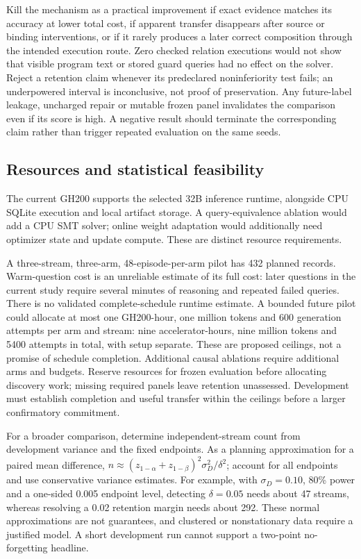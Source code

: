 \documentclass[10pt,twocolumn]{article}
\begin{document}
Kill the mechanism as a practical improvement if exact evidence matches its
accuracy at lower total cost, if apparent transfer disappears after source or
binding interventions, or if it rarely produces a later correct composition through the intended execution
route. Zero checked relation executions would not show that visible program
text or stored guard queries had no effect on the solver.
Reject a retention claim whenever its predeclared noninferiority test fails;
an underpowered interval is inconclusive, not proof of preservation. Any
future-label leakage, uncharged repair or mutable frozen panel invalidates the
comparison even if its score is high. A negative result should terminate the
corresponding claim rather than trigger repeated evaluation on the same seeds.

\subsection{Resources and statistical feasibility}
The current GH200 supports the selected 32B inference runtime, alongside CPU
SQLite execution and local artifact storage. A query-equivalence ablation would
add a CPU SMT solver; online weight adaptation would additionally need optimizer
state and update compute. These are distinct resource requirements.

A three-stream, three-arm, 48-episode-per-arm pilot has 432 planned records.
Warm-question cost is an unreliable estimate of its full cost: later questions
in the current study require several minutes of reasoning and repeated failed
queries. There is no validated complete-schedule runtime estimate. A bounded
future pilot could allocate at most one GH200-hour, one million tokens and
600 generation attempts per arm and stream: nine accelerator-hours, nine million
tokens and 5400 attempts in total, with setup separate. These are proposed
ceilings, not a promise of schedule completion. Additional causal ablations
require additional arms and budgets. Reserve resources for frozen evaluation
before allocating discovery work; missing required panels leave retention
unassessed. Development must establish completion and useful transfer within
the ceilings before a larger confirmatory commitment.

For a broader comparison, determine independent-stream count from development
variance and the fixed endpoints. As a planning approximation for a paired mean
difference, $n\approx(z_{1-\alpha}+z_{1-\beta})^2\sigma_D^2/\delta^2$;
account for all endpoints and use conservative variance estimates. For example,
with $\sigma_D=0.10$, 80\% power and a one-sided 0.005 endpoint level, detecting
$\delta=0.05$ needs about 47 streams, whereas resolving a 0.02 retention margin
needs about 292. These normal approximations are not guarantees, and clustered
or nonstationary data require a justified model. A short development run cannot
support a two-point no-forgetting headline.
\end{document}
